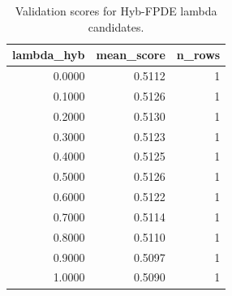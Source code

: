 \begin{table}[t]
\caption{Validation scores for Hyb-FPDE lambda candidates.}
\label{tab:lambda_distribution_computed}
\centering
\begin{tabular}{rrr}
\toprule
lambda\_hyb & mean\_score & n\_rows \\
\midrule
0.0000 & 0.5112 & 1 \\
0.1000 & 0.5126 & 1 \\
0.2000 & 0.5130 & 1 \\
0.3000 & 0.5123 & 1 \\
0.4000 & 0.5125 & 1 \\
0.5000 & 0.5126 & 1 \\
0.6000 & 0.5122 & 1 \\
0.7000 & 0.5114 & 1 \\
0.8000 & 0.5110 & 1 \\
0.9000 & 0.5097 & 1 \\
1.0000 & 0.5090 & 1 \\
\bottomrule
\end{tabular}

\end{table}
